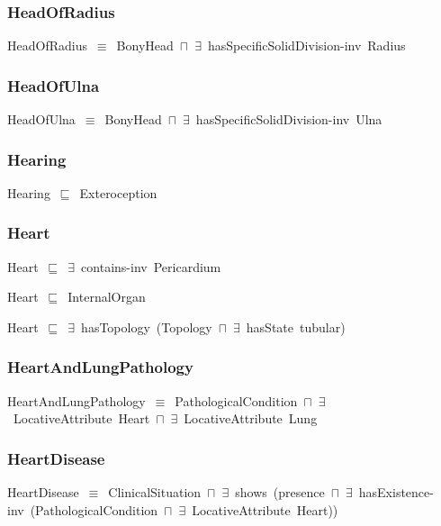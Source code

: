 \documentclass{article}
\begin{document}
\subsubsection*{HeadOfRadius}

HeadOfRadius~\ensuremath{\equiv}~BonyHead~\ensuremath{\sqcap}~\ensuremath{\exists}~hasSpecificSolidDivision-inv~Radius

\subsubsection*{HeadOfUlna}

HeadOfUlna~\ensuremath{\equiv}~BonyHead~\ensuremath{\sqcap}~\ensuremath{\exists}~hasSpecificSolidDivision-inv~Ulna

\subsubsection*{Hearing}

Hearing~\ensuremath{\sqsubseteq}~Exteroception~

\subsubsection*{Heart}

Heart~\ensuremath{\sqsubseteq}~\ensuremath{\exists}~contains-inv~Pericardium~

Heart~\ensuremath{\sqsubseteq}~InternalOrgan~

Heart~\ensuremath{\sqsubseteq}~\ensuremath{\exists}~hasTopology~(Topology~\ensuremath{\sqcap}~\ensuremath{\exists}~hasState~tubular)~

\subsubsection*{HeartAndLungPathology}

HeartAndLungPathology~\ensuremath{\equiv}~PathologicalCondition~\ensuremath{\sqcap}~\ensuremath{\exists}~LocativeAttribute~Heart~\ensuremath{\sqcap}~\ensuremath{\exists}~LocativeAttribute~Lung

\subsubsection*{HeartDisease}

HeartDisease~\ensuremath{\equiv}~ClinicalSituation~\ensuremath{\sqcap}~\ensuremath{\exists}~shows~(presence~\ensuremath{\sqcap}~\ensuremath{\exists}~hasExistence-inv~(PathologicalCondition~\ensuremath{\sqcap}~\ensuremath{\exists}~LocativeAttribute~Heart))
\end{document}
